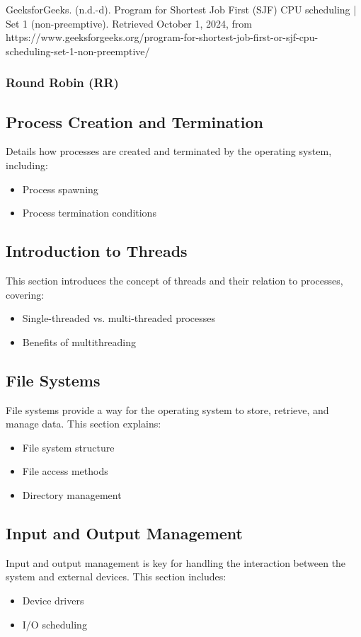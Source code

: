 \documentclass[12pt]{article}
\begin{document}
    GeeksforGeeks. (n.d.-d). Program for Shortest Job First (SJF) CPU scheduling | Set 1 (non-preemptive). Retrieved October 1, 2024, from https://www.geeksforgeeks.org/program-for-shortest-job-first-or-sjf-cpu-scheduling-set-1-non-preemptive/

    \subsubsection{Round Robin (RR)} 


\subsection{Process Creation and Termination}
Details how processes are created and terminated by the operating system, including:
\begin{itemize}
    \item Process spawning
    \item Process termination conditions
\end{itemize}

\subsection{Introduction to Threads}
This section introduces the concept of threads and their relation to processes, covering:
\begin{itemize}
    \item Single-threaded vs. multi-threaded processes
    \item Benefits of multithreading
\end{itemize}

\subsection{File Systems}
File systems provide a way for the operating system to store, retrieve, and manage data. This section explains:
\begin{itemize}
    \item File system structure
    \item File access methods
    \item Directory management
\end{itemize}

\subsection{Input and Output Management}
Input and output management is key for handling the interaction between the system and external devices. This section includes:
\begin{itemize}
    \item Device drivers
    \item I/O scheduling
\end{itemize}
\end{document}
